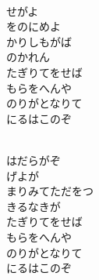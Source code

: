 \documentclass[10pt,b5j]{tarticle} %
\begin{document}
\vspace{1.5em} %
\newcommand{\linespace}{0.5em} %
\newcommand{\blocksize}{0.5\hsize} %
\newcommand{\itemmargin}{3em} %
\begin{enumerate} %
    \setlength{\itemindent}{\itemmargin} %
    \begin{minipage}[c]{\blocksize}
    
        \vspace{\linespace}
        \item~\\
        せがよ\\
        をのにめよ\\
        かりしもがば\\
        のかれん\\
        たぎりてをせば\\
        もらをへんや\\
        のりがとなりて\\
        にるはこのぞ
        
    \end{minipage}
    \begin{minipage}[c]{\blocksize}
        
        \vspace{\linespace}
        \item~\\
        はだらがぞ\\
        げよが\\
        まりみてただをつ\\
        きるなきが\\
        たぎりてをせば\\
        もらをへんや\\
        のりがとなりて\\
        にるはこのぞ
        

\end{minipage}
\end{enumerate}
\end{document}
